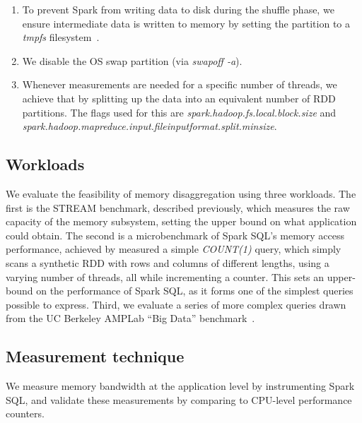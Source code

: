 \documentclass[9pt]{sig-alternate-05-2015}
\begin{document}
\begin{enumerate}
\item To prevent Spark from writing data to disk during the shuffle phase, we
ensure intermediate data is written to memory by setting the partition to a
{\it tmpfs} filesystem~\cite{WikiTmpfs}.

\item We disable the OS swap partition (via {\it swapoff -a}).

\item Whenever measurements are needed for a specific number of threads, we
achieve that by splitting up the data into an equivalent number of RDD
partitions. The flags used for this are
{\it spark.hadoop.\-fs.local.\-block.\-size} and
{\it spark.hadoop.mapreduce.\-input.file\-input\-format.\-split.minsize}.

\end{enumerate}

\subsection{Workloads}
\label{sec:workloads}

We evaluate the feasibility of memory disaggregation using three workloads.
The first is the STREAM benchmark, described previously, which measures the raw
capacity of the memory subsystem, setting the upper bound on what application
could obtain.  The second is a microbenchmark of Spark SQL's memory access
performance, achieved by measured a simple {\it COUNT(1)} query, which simply
scans a synthetic RDD with rows and columns of different lengths, using a
varying number of threads, all while incrementing a counter.  This sets an
upper-bound on the performance of Spark SQL, as it forms one of the simplest
queries possible to express.
Third, we evaluate a series of more complex queries drawn from the UC Berkeley
AMPLab ``Big Data'' benchmark~\cite{bigDataBenchmark}.

\subsection{Measurement technique}
\label{sec:measurement}

We measure memory bandwidth at the application level by instrumenting Spark
SQL, and validate these measurements by comparing to CPU-level performance
counters.
\end{document}

